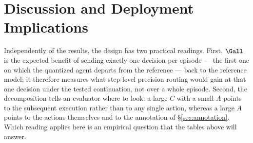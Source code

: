 \section{Discussion and Deployment Implications}
\label{sec:discussion}


Independently of the results, the design has two practical readings. First, $\Gall$ is the expected benefit of sending exactly one decision per episode --- the first one on which the quantized agent departs from the reference --- back to the reference model; it therefore measures what step-level precision routing would gain at that one decision under the tested continuation, not over a whole episode. Second, the decomposition tells an evaluator where to look: a large $C$ with a small $A$ points to the subsequent execution rather than to any single action, whereas a large $A$ points to the actions themselves and to the annotation of \S\ref{sec:annotation}. Which reading applies here is an empirical question that the tables above will answer.
